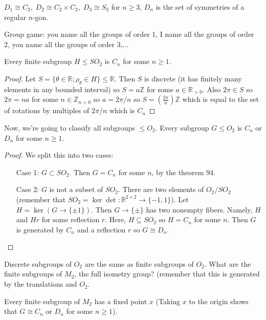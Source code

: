 \documentclass{article}
\newcommand{\R}{\mathbb{R}}
\newcommand{\Z}{\mathbb{Z}}
\newcommand{\ra}[1][]{\xrightarrow{#1}}
\begin{document}
\begin{fact}
$D_1\cong C_2,\; D_2\cong C_2\times C_2,\; D_3\cong S_3$ for $n\geq 3$, $D_n$ is the set of symmetries of a regular $n$-gon.
\end{fact}
\begin{fact}
Group game: you name all the groups of order 1, I name all the groups of order 2, you name all the groups of order 3,...
\end{fact}
\begin{theorem}
Every finite subgroup $H\leq SO_2$ is $C_n$ for some $n\geq 1$. 
\end{theorem}
\begin{proof}
Let $S=\{\theta\in\R;\rho_\theta\in H\}\leq \R$. Then $S$ is discrete (it has finitely many elements in any bounded interval) so $S=a\Z$ for some $a\in \R_{>0}$. Also $2\pi\in S$ so $2\pi=na$ for some $n\in \Z_{n>0}$ so $a=2\pi/n$ so $S=(\frac{2\pi}{n})\Z$ which is equal to the set of rotations by multiples of $2\pi/n$ which is $C_n$
\end{proof}
\begin{theorem}
Now, we're going to classify all subgroups $\leq O_2$. Every subgroup $G\leq O_2$ is $C_n$ or $D_n$ for some $n\geq 1$.
\end{theorem}
\begin{proof}
We split this into two cases:
\begin{itemize}
    \item[Case 1:] $G\subset SO_2$. Then $G=C_n$ for some $n$, by the theorem 94.
    \item[Case 2:] $G$ is not a subset of $SO_2$. There are two elements of $O_2/SO_2$ (remember that $SO_2=\ker\det:\R^{2\times 2}\ra \{-1,1\}$). Let $H=\ker(G\ra\{\pm 1\})$. Then $G\ra\{\pm\}$ has two nonempty fibers. Namely, $H$ and $Hr$ for some reflection $r$. Here, $H\subseteq SO_2$ so $H=C_n$ for some $n$. Then $G$ is generated by $C_n$ and a reflection $r$ so $G\cong D_n$. 
\end{itemize}
\end{proof}
Discrete subgroups of $O_2$ are the same as finite subgroups of $O_2$. What are the finite subgroups of $M_2$, the full isometry group? (remember that this is generated by the translations and $O_2$. 
\begin{theorem}
Every finite subgroup of $M_2$ has a fixed point $x$ (Taking $x$ to the origin shows that $G\cong C_n$ or $D_n$ for some $n\geq 1$). 
\end{theorem}
\end{document}
